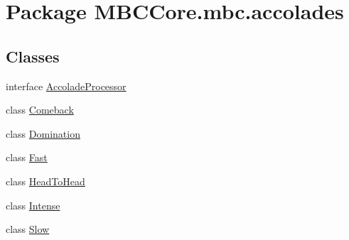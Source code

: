 \hypertarget{namespace_m_b_c_core_1_1mbc_1_1accolades}{\section{Package M\-B\-C\-Core.\-mbc.\-accolades}
\label{namespace_m_b_c_core_1_1mbc_1_1accolades}
}
\subsection*{Classes}
\begin{DoxyCompactItemize}
\item 
interface \hyperlink{interface_m_b_c_core_1_1mbc_1_1accolades_1_1_accolade_processor}{Accolade\-Processor}
\item 
class \hyperlink{class_m_b_c_core_1_1mbc_1_1accolades_1_1_comeback}{Comeback}
\item 
class \hyperlink{class_m_b_c_core_1_1mbc_1_1accolades_1_1_domination}{Domination}
\item 
class \hyperlink{class_m_b_c_core_1_1mbc_1_1accolades_1_1_fast}{Fast}
\item 
class \hyperlink{class_m_b_c_core_1_1mbc_1_1accolades_1_1_head_to_head}{Head\-To\-Head}
\item 
class \hyperlink{class_m_b_c_core_1_1mbc_1_1accolades_1_1_intense}{Intense}
\item 
class \hyperlink{class_m_b_c_core_1_1mbc_1_1accolades_1_1_slow}{Slow}
\end{DoxyCompactItemize}
